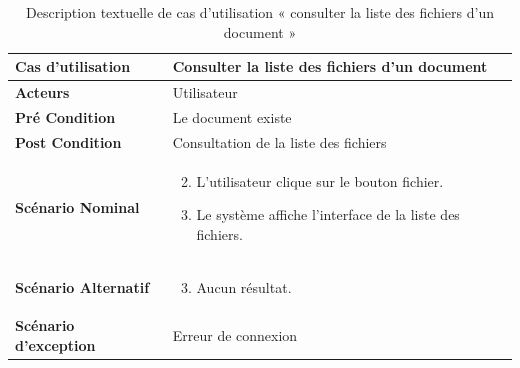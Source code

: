 \begin{longtable}{|p{5cm}|p{10cm}|}
  \caption{Description textuelle de cas d'utilisation « consulter la liste des fichiers d'un document »} \label{tab:DescriptionTextuelleDeCasDUtilisationConsulterLaListeDesFichiersDUnDocument} \\
\hline
\textbf{Cas d'utilisation}&Consulter la liste des fichiers d'un document\\
\hline
\textbf{Acteurs}&Utilisateur\\
\hline
\textbf{Pré Condition}&Le document existe\\
\hline
\textbf{Post Condition}&Consultation de la liste des fichiers\\
\hline
\textbf{Scénario Nominal}&
\vspace{-\baselineskip}
\begin{enumerate}
    \setcounter{enumi}{1}
    \item L'utilisateur clique sur le bouton fichier.
    \item Le système affiche l'interface de la liste des fichiers.
    
\end{enumerate}\\
\hline
\textbf{Scénario Alternatif}&
\vspace{-\baselineskip}
\begin{enumerate}
    \setcounter{enumi}{2}
    \item Aucun résultat.
\end{enumerate}\\
\hline
\textbf{Scénario d'exception}&Erreur de connexion\\
\hline

\end{longtable}


